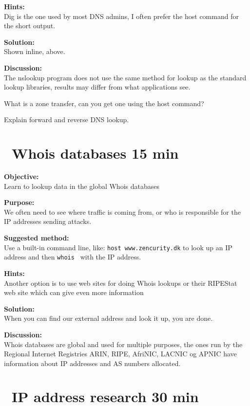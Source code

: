 \documentclass[a4paper,11pt,notitlepage]{report}
\begin{document}
{\bf Hints:}\\
Dig is the one used by most DNS admins, I often prefer the host command for the short output.

{\bf Solution:}\\
Shown inline, above.

{\bf Discussion:}\\
The nslookup program does not use the same method for lookup as the standard lookup libraries, results may differ from what applications see.

What is a zone transfer, can you get one using the host command?

Explain forward and reverse DNS lookup.

\chapter{\faInfoCircle\ Whois databases 15 min}
\label{ex:whois}

{\bf Objective:}\\
Learn to lookup data in the global Whois databases

{\bf Purpose:}\\
We often need to see where traffic is coming from, or who is responsible for the IP addresses sending attacks.

{\bf Suggested method:}\\
Use a built-in command line, like: \verb+host www.zencurity.dk+ to look up an IP address and then \verb+whois + with the IP address.

{\bf Hints:}\\
Another option is to use web sites for doing Whois lookups  or their RIPEStat web site which can give even more information

{\bf Solution:}\\
When you can find our external address and look it up, you are done.

{\bf Discussion:}\\
Whois databases are global and used for multiple purposes, the ones run by the Regional Internet Registries ARIN, RIPE, AfriNIC, LACNIC og APNIC have information about IP addresses and AS numbers allocated.


\chapter{\faInfoCircle\ IP address research 30 min}
\label{ex:ip-address-research}
\end{document}
